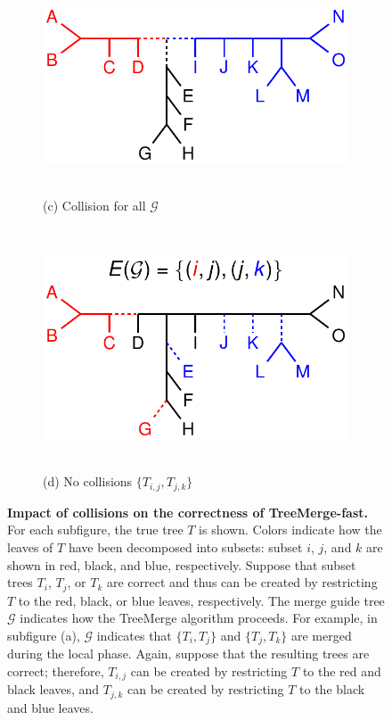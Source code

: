 \begin{figure}[!h]
	\begin{subfigure}[t]{0.45\textwidth}
	\centering
		\includegraphics[width=\textwidth]{figures/treemerge-fig3c.pdf}
		~
		\caption{(c) Collision for all $\mathcal{G}$} 
	\end{subfigure}
	~~~~~~~~~~
	\begin{subfigure}[t]{0.45\textwidth}
	\centering
		\includegraphics[width=\textwidth]{figures/treemerge-fig3d.pdf}
		~
		\caption{(d) No collisions $\{ T_{i,j}, T_{j,k} \}$} 
	\end{subfigure}
\caption{
{\bf Impact of collisions on the correctness of TreeMerge-fast. }
For each subfigure, the true tree $T$ is shown. 
Colors indicate how the leaves of $T$ have been decomposed into subsets: subset $i$, $j$, and $k$ are shown in red, black, and blue, respectively.
Suppose that subset trees $T_i$, $T_j$, or $T_k$ are correct and thus can be created by restricting $T$ to the red, black, or blue leaves, respectively.
The merge guide tree $\mathcal{G}$ indicates how the TreeMerge algorithm proceeds.
For example, in subfigure (a), $\mathcal{G}$ indicates that $\{T_i, T_j\}$ and $\{T_j, T_k\}$ are merged during the local phase. 
Again, suppose that the resulting trees are correct; therefore, $T_{i,j}$  can be created by restricting $T$ to the red and black leaves, and $T_{j,k}$ can be created by restricting $T$ to the black and blue leaves.
}
\end{figure}
